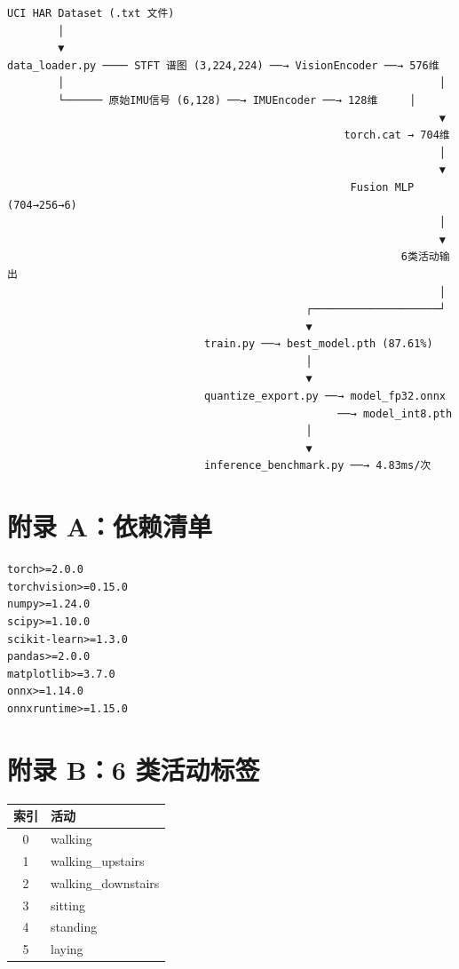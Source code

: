 \documentclass[12pt,a4paper]{ctexart}
\begin{document}
\begin{verbatim}
UCI HAR Dataset (.txt 文件)
        │
        ▼
data_loader.py ──── STFT 谱图 (3,224,224) ──→ VisionEncoder ──→ 576维
        │                                                           │
        └────── 原始IMU信号 (6,128) ──→ IMUEncoder ──→ 128维     │
                                                                    ▼
                                                     torch.cat → 704维
                                                                    │
                                                                    ▼
                                                      Fusion MLP (704→256→6)
                                                                    │
                                                                    ▼
                                                              6类活动输出
                                                                    │
                                               ┌────────────────────┘
                                               ▼
                               train.py ──→ best_model.pth (87.61%)
                                               │
                                               ▼
                               quantize_export.py ──→ model_fp32.onnx
                                                    ──→ model_int8.pth
                                               │
                                               ▼
                               inference_benchmark.py ──→ 4.83ms/次
\end{verbatim}

\newpage
\section*{附录 A：依赖清单}

\begin{lstlisting}
torch>=2.0.0
torchvision>=0.15.0
numpy>=1.24.0
scipy>=1.10.0
scikit-learn>=1.3.0
pandas>=2.0.0
matplotlib>=3.7.0
onnx>=1.14.0
onnxruntime>=1.15.0
\end{lstlisting}

\section*{附录 B：6 类活动标签}

\begin{table}[h]
\centering
\begin{tabular}{@{}cl@{}}
\toprule
\textbf{索引} & \textbf{活动} \\
\midrule
0 & walking \\
1 & walking\_upstairs \\
2 & walking\_downstairs \\
3 & sitting \\
4 & standing \\
5 & laying \\
\bottomrule
\end{tabular}
\end{table}
\end{document}
